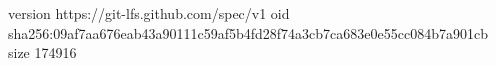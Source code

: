 version https://git-lfs.github.com/spec/v1
oid sha256:09af7aa676eab43a90111c59af5b4fd28f74a3cb7ca683e0e55cc084b7a901cb
size 174916
